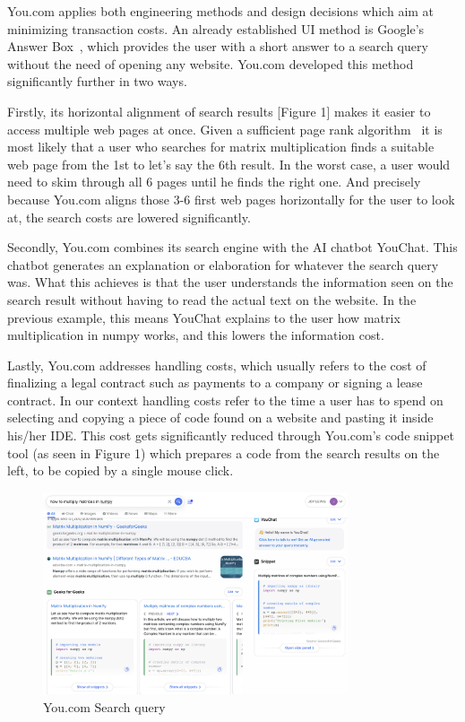 \documentclass[5p,twocolumn,final]{elsarticle}
\begin{document}
You.com applies both engineering methods and design decisions which aim at minimizing transaction costs. An already established UI method is Google's Answer Box~\cite{miklovsik2016}, which provides the user with a short answer to a search query without the need of opening any website. You.com developed this method significantly further in two ways. \par Firstly, its horizontal alignment of search results [Figure 1] makes it easier to access multiple web pages at once. Given a sufficient page rank algorithm~\cite{duhan2009IN} it is most likely that a user who searches for matrix multiplication finds a suitable web page from the 1st to let's say the 6th result. In the worst case, a user would need to skim through all 6 pages until he finds the right one. And precisely because You.com aligns those 3-6 first web pages horizontally for the user to look at, the search costs are lowered significantly. \par
Secondly, You.com combines its search engine with the AI chatbot YouChat. This chatbot generates an explanation or elaboration for whatever the search query was.  What this achieves is that the user understands the information seen on the search result without having to read the actual text on the website. In the previous example, this means YouChat explains to the user how matrix multiplication in numpy works, and this lowers the information cost. \par
Lastly, You.com addresses handling costs, which usually refers to the cost of finalizing a legal contract such as payments to a company or signing a lease contract. In our context handling costs refer to the time a user has to spend on selecting and copying a piece of code found on a website and pasting it inside his/her IDE. This cost gets significantly reduced through You.com's code snippet tool (as seen in Figure 1) which prepares a code from the search results on the left, to be copied by a single mouse click.
\begin{figure}[h]
\centering
\includegraphics[width=9cm]{numpy mult - You.com.png}
\caption{You.com Search query}
\label{fig:fig1}
\end{figure}
\end{document}

